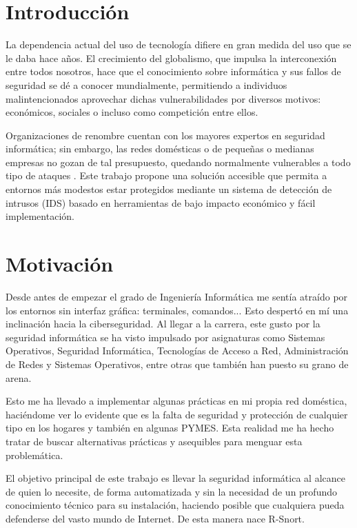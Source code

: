 \documentclass[11pt,a4paper,twoside]{report}
\begin{document}
\chapter*{Introducción}
La dependencia actual del uso de tecnología difiere en gran medida del uso que se le daba hace años. El crecimiento del globalismo, que impulsa la interconexión entre todos nosotros, hace que el conocimiento sobre informática y sus fallos de seguridad se dé a conocer mundialmente, permitiendo a individuos malintencionados aprovechar dichas vulnerabilidades por diversos motivos: económicos, sociales o incluso como competición entre ellos.\newline

Organizaciones de renombre cuentan con los mayores expertos en seguridad informática; sin embargo, las redes domésticas o de pequeñas o medianas empresas no gozan de tal presupuesto, quedando normalmente vulnerables a todo tipo de ataques \cite{enisa_smes}. Este trabajo propone una solución accesible que permita a entornos más modestos estar protegidos mediante un sistema de detección de intrusos (IDS) basado en herramientas de bajo impacto económico y fácil implementación.

\chapter{Motivación}
Desde antes de empezar el grado de Ingeniería Informática me sentía atraído por los entornos sin interfaz gráfica: terminales, comandos... Esto despertó en mí una inclinación hacia la ciberseguridad. Al llegar a la carrera, este gusto por la seguridad informática se ha visto impulsado por asignaturas como Sistemas Operativos, Seguridad Informática, Tecnologías de Acceso a Red, Administración de Redes y Sistemas Operativos, entre otras que también han puesto su grano de arena.\newline

Esto me ha llevado a implementar algunas prácticas en mi propia red doméstica, haciéndome ver lo evidente que es la falta de seguridad y protección de cualquier tipo en los hogares y también en algunas PYMES. Esta realidad me ha hecho tratar de buscar alternativas prácticas y asequibles para menguar esta problemática.\newline

El objetivo principal de este trabajo es llevar la seguridad informática al alcance de quien lo necesite, de forma automatizada y sin la necesidad de un profundo conocimiento técnico para su instalación, haciendo posible que cualquiera pueda defenderse del vasto mundo de Internet. De esta manera nace R-Snort.\newline
\end{document}
